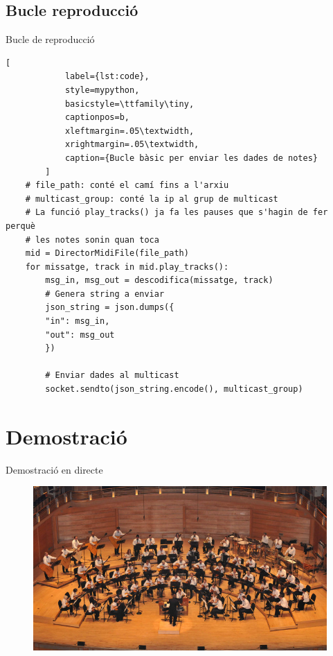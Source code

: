 \documentclass{beamer}
\begin{document}
\subsection{Bucle reproducció}
\begin{frame}[fragile]{Bucle de reproducció}
	\begin{lstlisting}[
			label={lst:code},
			style=mypython, 
			basicstyle=\ttfamily\tiny,
			captionpos=b,
			xleftmargin=.05\textwidth, 
			xrightmargin=.05\textwidth,
			caption={Bucle bàsic per enviar les dades de notes}
		]
	# file_path: conté el camí fins a l'arxiu
	# multicast_group: conté la ip al grup de multicast
	# La funció play_tracks() ja fa les pauses que s'hagin de fer perquè
	# les notes sonin quan toca
	mid = DirectorMidiFile(file_path)
	for missatge, track in mid.play_tracks():
		msg_in, msg_out = descodifica(missatge, track)
		# Genera string a enviar
		json_string = json.dumps({
		"in": msg_in,
		"out": msg_out
		})
		
		# Enviar dades al multicast
		socket.sendto(json_string.encode(), multicast_group)
	\end{lstlisting}
\end{frame}

\section{Demostració}
\begin{frame}{Demostració en directe}
	\begin{figure}
		\includegraphics[width=\linewidth]{images/orchestra}
	\end{figure}
\end{frame}
\end{document}
